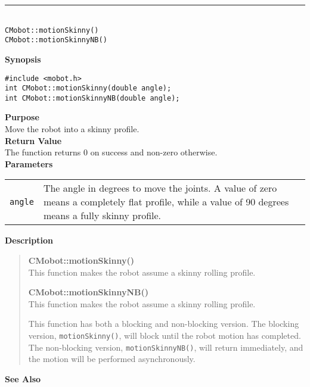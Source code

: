 \noindent
\vspace{5pt}
\rule{4.5in}{0.015in}\\
\noindent
{\LARGE \texttt{CMobot::motionSkinny()}}\\
{\LARGE \texttt{CMobot::motionSkinnyNB()}}\\
{}

\noindent
{\bf Synopsis}
\vspace{-8pt}
\begin{verbatim}
#include <mobot.h>
int CMobot::motionSkinny(double angle);
int CMobot::motionSkinnyNB(double angle);
\end{verbatim}

\noindent
{\bf Purpose}\\
Move the robot into a skinny profile.\\

\noindent
{\bf Return Value}\\
The function returns 0 on success and non-zero otherwise.\\

\noindent
{\bf Parameters}\\
\vspace{-0.1in}
\begin{description}
\item               
\begin{tabular}{p{10 mm}p{145 mm}}
\texttt{angle} & The angle in degrees to move the joints. A value of zero means a
completely flat profile, while a value of 90 degrees means a fully skinny
profile.  \\
\end{tabular}
\end{description}


\noindent
{\bf Description}\\
\vspace{-12pt}
\begin{quote}
{\bf CMobot::motionSkinny()}\\
This function makes the robot assume a skinny rolling profile.

{\bf CMobot::motionSkinnyNB()}\\
This function makes the robot assume a skinny rolling profile.

This function has both a blocking and non-blocking version.
The blocking version, \texttt{motionSkinny()}, will block until the
robot motion has completed. The non-blocking version, \texttt{motionSkinnyNB()},
will return immediately, and the motion will be performed asynchronously.\\
\end{quote}

\noindent
{\bf See Also}\\

